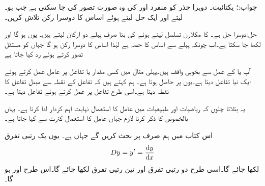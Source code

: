 جواب:؛ یکتائیت۔ 
دوہرا جذر کو منفرد  اور  کی وہ صورت تصور کی جا سکتی ہے جب  ہو۔ لیتے اور ایک حل  لیتے ہوئے اساس کا دوسرا رکن   تلاش کریں۔

حل:دوسرا حل  ہے۔ کا مکلارن تسلسل لیتے ہوئے  کی بنا صرف پہلے دو ارکان لیتے ہیں۔
یوں   ہو گا اور 
 لکھا جا سکتا ہے۔اب چونکہ  پہلے سے اساس کا حصہ ہے لہٰذا اساس کا دوسرا رکن  ہو گا جہاں  کو مستقل تصور کرتے ہوئے رد کیا جاتا ہے

آپ  یا  کے عمل سے بخوبی واقف ہیں۔پہلی مثال میں کسی مقدار یا تفاعل  پر عامل  عمل کرتے ہوئے ایک نیا تفاعل دیتا ہے۔یوں  پر  حاصل ہوتا ہے۔ ہم کہتے ہیں کہ   تفاعل  کے نقطہ  سے مبدل تفاعل  کا نقطہ  دیتا ہے۔اسی طرح   تفاعل  پر عمل کرتے ہوئے تفاعل  دیتا ہے۔

یہ بتلاتا چلوں کہ ریاضیات اور طبیعیات میں عامل کا استعمال نہایت اہم کردار ادا کرتا ہے۔ یہاں بالخصوص  کا ذکر کرنا لازم جہاں عامل کا استعمال کثرت سے کیا جاتا ہے۔ 

اس کتاب میں ہم صرف   پر بحث کریں گے جہاں  ہے۔ یوں یک رتبی تفرق
\begin{align}
Dy=y'=\frac{\dif y}{\dif x}
\end{align}
لکھا جائے گا۔اسی طرح دو رتبی تفرق  اور تین رتبی تفرق  لکھا جائے گا۔اس طرح  اور  ہو گا۔

